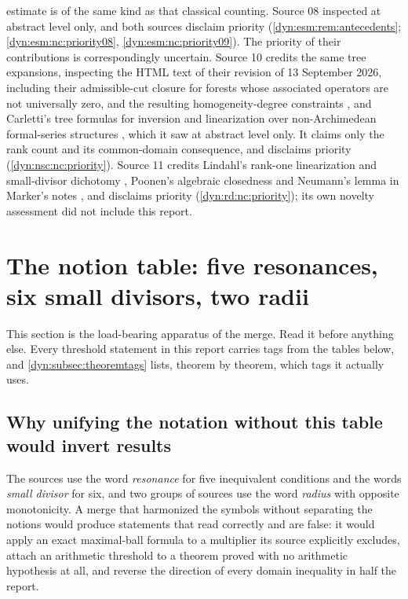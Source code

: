 \documentclass[11pt,letterpaper]{article}
\theoremstyle{definition}
\theoremstyle{remark}
\numberwithin{equation}{section}
\begin{document}
estimate is of the same kind as that classical counting. Source 08
inspected \cite{FauvetMenousSauzin} at abstract level only, and both sources
disclaim priority (\cref{dyn:esm:rem:antecedents};
\ref{dyn:esm:nc:priority08}, \ref{dyn:esm:nc:priority09}). The priority of
their contributions is correspondingly uncertain. Source 10 credits the
same tree expansions, inspecting the HTML text of their revision of
13 September 2026, including their
admissible-cut closure for forests whose associated operators are not
universally zero, and the resulting homogeneity-degree constraints
\cite[Thm.~E and Prop.~5.6]{FMS26}, and Carletti's
tree formulas for inversion and linearization over non-Archimedean
formal-series structures \cite{CarlettiLagrange}, which it saw at abstract
level only. It claims only the rank count and its common-domain consequence,
and disclaims priority (\ref{dyn:nsc:nc:priority}). Source 11 credits
Lindahl's rank-one linearization and small-divisor dichotomy
\cite{Lindahl}, Poonen's algebraic closedness \cite{Poonen} and Neumann's
lemma in Marker's notes \cite{Marker}, and disclaims priority
(\ref{dyn:rd:nc:priority}); its own novelty assessment did not include this
report.

\section{The notion table: five resonances, six small divisors, two radii}
\label{dyn:sec:notions}

This section is the load-bearing apparatus of the merge. Read it before
anything else. Every threshold statement in this report carries tags from
the tables below, and \cref{dyn:subsec:theoremtags} lists, theorem by
theorem, which tags it actually uses.

\subsection{Why unifying the notation without this table would invert results}
The sources use the word \emph{resonance} for five inequivalent
conditions and the words \emph{small divisor} for six, and two groups of
sources use the word \emph{radius} with opposite monotonicity. A merge that
harmonized the symbols without separating the notions would produce
statements that read correctly and are false: it would apply an exact
maximal-ball formula to a multiplier its source explicitly excludes,
attach an arithmetic threshold to a theorem proved with no arithmetic
hypothesis at all, and reverse the direction of every domain inequality in
half the report.
\end{document}
